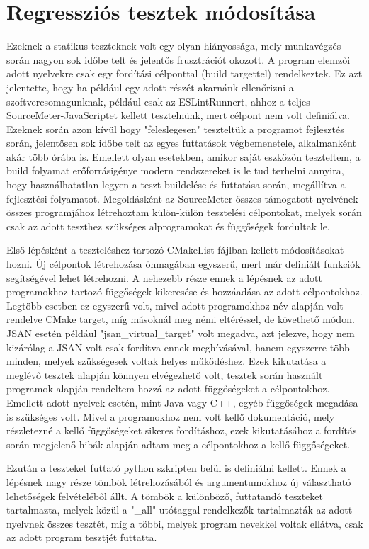 \section{Regressziós tesztek módosítása}

Ezeknek a statikus teszteknek volt egy olyan hiányossága, mely munkavégzés során nagyon sok időbe telt és jelentős frusztrációt okozott. A program elemzői adott nyelvekre csak egy fordítási célponttal (build targettel) rendelkeztek. Ez azt jelentette, hogy ha például egy adott részét akarnánk ellenőrizni a szoftvercsomagunknak, például csak az ESLintRunnert, ahhoz a teljes SourceMeter-JavaScriptet kellett tesztelnünk, mert célpont nem volt definiálva. Ezeknek során azon kívül hogy "feleslegesen" teszteltük a programot fejlesztés során, jelentősen sok időbe telt az egyes futtatások végbemenetele, alkalmanként akár több órába is. Emellett olyan esetekben, amikor saját eszközön teszteltem, a build folyamat erőforrásigénye modern rendszereket is le tud terhelni annyira, hogy használhatatlan legyen a teszt buildelése és futtatása során, megállítva a fejlesztési folyamatot.
Megoldásként az SourceMeter összes támogatott nyelvének összes programjához létrehoztam külön-külön tesztelési célpontokat, melyek során csak az adott teszthez szükséges alprogramokat és függőségek fordultak le.

Első lépésként a teszteléshez tartozó CMakeList fájlban kellett módosításokat hozni. Új célpontok létrehozása önmagában egyszerű, mert már definiált funkciók segítségével lehet létrehozni. A nehezebb része ennek a lépésnek az adott programokhoz tartozó függőségek kikeresése és hozzáadása az adott célpontokhoz. Legtöbb esetben ez egyszerű volt, mivel adott programokhoz név alapján volt rendelve CMake target, míg másoknál meg némi eltéréssel, de követhető módon. JSAN esetén például "jsan\_virtual\_target" volt megadva, azt jelezve, hogy nem kizárólag a JSAN volt csak fordítva ennek meghívásával, hanem egyszerre több minden, melyek szükségesek voltak helyes működéshez. Ezek kikutatása a meglévő tesztek alapján könnyen elvégezhető volt, tesztek során használt programok alapján rendeltem hozzá az adott függőségeket a célpontokhoz. Emellett adott nyelvek esetén, mint Java vagy C++, egyéb függőségek megadása is szükséges volt. Mivel a programokhoz nem volt kellő dokumentáció, mely részletezné a kellő függőségeket sikeres fordításhoz, ezek kikutatásához a fordítás során megjelenő hibák alapján adtam meg a célpontokhoz a kellő függőségeket. 

Ezután a teszteket futtató python szkripten belül is definiálni kellett.
Ennek a lépésnek nagy része tömbök létrehozásából és argumentumokhoz új választható lehetőségek felvételéből állt. A tömbök a különböző, futtatandó teszteket tartalmazta, melyek közül a "\_all" utótaggal rendelkezők tartalmazták az adott nyelvnek összes tesztét, míg a többi, melyek program nevekkel voltak ellátva, csak az adott program tesztjét futtatta.

